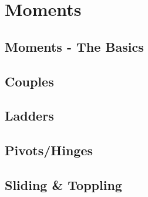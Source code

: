 \documentclass[../alevelmaths.tex]{subfiles}
\begin{document}
\chapter{Moments}
\section{Moments - The Basics}
\section{Couples}
\section{Ladders}
\section{Pivots/Hinges}
\section{Sliding \& Toppling}
\end{document}
